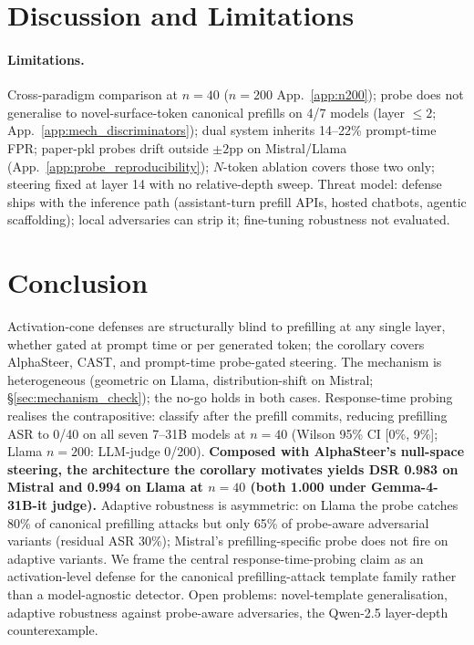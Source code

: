 \documentclass{article}
\begin{document}
\section{Discussion and Limitations}
\label{sec:discussion}

\paragraph{Limitations.}
Cross-paradigm comparison at $n=40$ ($n=200$ App.~\ref{app:n200}); probe does not generalise to novel-surface-token canonical prefills on 4/7 models (layer $\leq 2$; App.~\ref{app:mech_discriminators}); dual system inherits 14--22\% prompt-time FPR; paper-pkl probes drift outside $\pm 2$pp on Mistral/Llama (App.~\ref{app:probe_reproducibility}); $N$-token ablation covers those two only; steering fixed at layer 14 with no relative-depth sweep. Threat model: defense ships with the inference path (assistant-turn prefill APIs, hosted chatbots, agentic scaffolding); local adversaries can strip it; fine-tuning robustness not evaluated.


\section{Conclusion}
\label{sec:conclusion}

Activation-cone defenses are structurally blind to prefilling at any single layer, whether gated at prompt time or per generated token; the corollary covers AlphaSteer, CAST, and prompt-time probe-gated steering. The mechanism is heterogeneous (geometric on Llama, distribution-shift on Mistral; \S\ref{sec:mechanism_check}); the no-go holds in both cases. Response-time probing realises the contrapositive: classify after the prefill commits, reducing prefilling ASR to 0/40 on all seven 7--31B models at $n=40$ (Wilson 95\% CI [0\%, 9\%]; Llama $n=200$: LLM-judge 0/200). \textbf{Composed with AlphaSteer's null-space steering, the architecture the corollary motivates yields DSR 0.983 on Mistral and 0.994 on Llama at $n=40$ (both 1.000 under Gemma-4-31B-it judge).} Adaptive robustness is asymmetric: on Llama the probe catches 80\% of canonical prefilling attacks but only 65\% of probe-aware adversarial variants (residual ASR 30\%); Mistral's prefilling-specific probe does not fire on adaptive variants. We frame the central response-time-probing claim as an activation-level defense for the canonical prefilling-attack template family rather than a model-agnostic detector. Open problems: novel-template generalisation, adaptive robustness against probe-aware adversaries, the Qwen-2.5 layer-depth counterexample.
\end{document}
